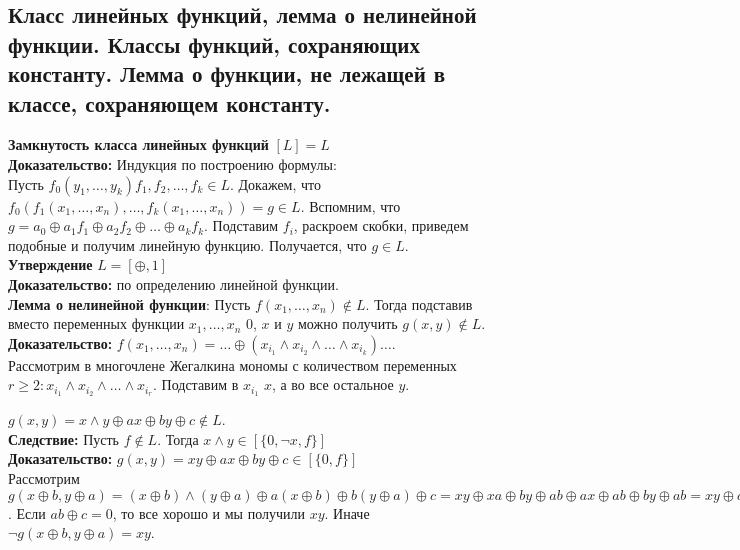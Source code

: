 \subsection{Класс линейных функций, лемма о нелинейной функции. Классы функций, сохраняющих константу. Лемма о функции, не лежащей в классе, сохраняющем константу.}
\textbf{Замкнутость класса линейных функций} $[L] = L$\\

\noindent \textbf{Доказательство:} Индукция по построению формулы:\\

Пусть $f_0(y_1, \ldots, y_k) f_1, f_2, \ldots, f_k \in L$. Докажем, что $f_0 (f_1(x_1,\ldots,x_n),\ldots,f_k(x_1,\ldots,x_n)) = g \in L$.
Вспомним, что $g = a_0 \oplus a_1f_1 \oplus a_2f_2 \oplus \ldots \oplus a_kf_k$. Подставим $f_i$, раскроем скобки, приведем подобные и получим линейную функцию. Получается, что $g \in L$.\\

\textbf{Утверждение} $L = [{\oplus, 1}]$\\

\noindent \textbf{Доказательство:} по определению линейной функции.\\

\textbf{Лемма о нелинейной функции}: Пусть $f(x_1, \ldots, x_n) \notin L$. Тогда подставив вместо переменных функции $x_1, \ldots, x_n$ 0, $x$ и $y$ можно получить $g(x, y) \notin L$.\\

\noindent \textbf{Доказательство:} $f(x_1,\ldots,x_n) = \ldots \oplus (x_{i_1} \wedge x_{i_2} \wedge \ldots \wedge x_{i_k}) \ldots$.\\

Рассмотрим в многочлене Жегалкина мономы с количеством переменных $r \ge 2: x_{i_1} \wedge x_{i_2} \wedge \ldots \wedge x_{i_r}$. Подставим в $x_{i_1}$ $x$, а во все остальное $y$.

$g(x, y) = x \wedge y \oplus ax \oplus by \oplus c \notin L$.\\

\textbf{Следствие:} Пусть $f \notin L$. Тогда $x \wedge y \in [\{0, \neg x, f\}]$\\

\noindent \textbf{Доказательство:} $g(x, y) = xy \oplus ax \oplus by \oplus c \in [\{0, f\}]$\\

Рассмотрим $g(x \oplus b, y \oplus a) = (x \oplus b) \wedge (y \oplus a) \oplus a(x \oplus b) \oplus b(y \oplus a) \oplus c = xy \oplus xa \oplus by \oplus ab \oplus ax \oplus ab \oplus by \oplus ab = xy \oplus ab \oplus c$.
Если $ab \oplus c = 0$, то все хорошо и мы получили $xy$.
Иначе $\neg g(x \oplus b, y \oplus a) = xy$.\\

